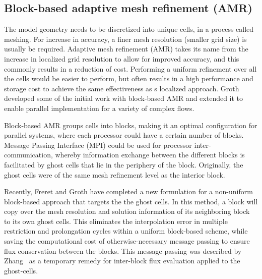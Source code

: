 \subsection{Block-based adaptive mesh refinement (AMR)}
The model geometry needs to be discretized into unique cells, in a process called meshing. For increase in accuracy, a finer mesh resolution (smaller grid size) is usually be required. Adaptive mesh refinement (AMR) takes its name from the increase in localized grid resolution to allow for improved accuracy, and this commonly results in a reduction of cost. Performing a uniform refinement over all the cells would be easier to perform, but often results in a high performance and storage cost to achieve the same effectiveness as s localized approach. Groth \etal ~\cite{Groth:1999, Williamschen:2013, Northrup:2005b, Groth:2013, zhang:2011a, zhang:2011b} developed some of the initial work with block-based AMR and extended it to enable parallel implementation for a variety of complex flows.

Block-based AMR groups cells into blocks, making it an optimal configuration for parallel systems, where each processor could have a certain number of blocks. Message Passing Interface (MPI) could be used for processor inter-communication, whereby  information exchange between the different blocks is facilitated by ghost cells that lie in the periphery of the block. Originally, the ghost cells were of the same mesh refinement level as the interior block.\par

Recently, Freret and Groth \cite{Freret:2015} have completed a new formulation for a non-uniform block-based approach that targets the the ghost cells. In this method, a block will copy over the mesh resolution and solution information of its neighboring block to its own ghost cells. This eliminates the interpolation error in multiple restriction and prolongation cycles within a uniform block-based scheme, while saving the computational cost of otherwise-necessary message passing to ensure flux conservation between the blocks. This message passing was described by Zhang~\cite{zhang:2011b} as a temporary remedy for inter-block flux evaluation applied to the ghost-cells.\par


